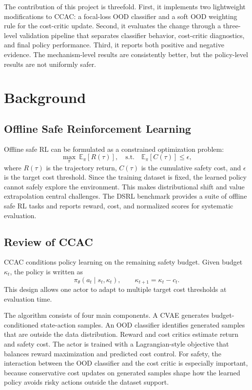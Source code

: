 \documentclass[11pt,a4paper]{article}
\newcommand{\ccac}{\textsc{CCAC}}
\begin{document}
The contribution of this project is threefold. First, it implements two
lightweight modifications to \ccac{}: a focal-loss OOD classifier and a soft
OOD weighting rule for the cost-critic update. Second, it evaluates the change
through a three-level validation pipeline that separates classifier behavior,
cost-critic diagnostics, and final policy performance. Third, it reports both
positive and negative evidence. The mechanism-level results are consistently
better, but the policy-level results are not uniformly safer.

\section{Background}

\subsection{Offline Safe Reinforcement Learning}

Offline safe RL can be formulated as a constrained optimization problem:
\begin{equation}
  \max_{\pi} \ \mathbb{E}_{\pi}\left[R(\tau)\right],
  \quad
  \mathrm{s.t.}\quad
  \mathbb{E}_{\pi}\left[C(\tau)\right] \le \epsilon,
  \label{eq:offline-safe-rl}
\end{equation}
where \(R(\tau)\) is the trajectory return, \(C(\tau)\) is the cumulative
safety cost, and \(\epsilon\) is the target cost threshold. Since the training
dataset is fixed, the learned policy cannot safely explore the environment.
This makes distributional shift and value extrapolation central challenges.
The DSRL benchmark \cite{liu2024dsrl} provides a suite of offline safe RL tasks
and reports reward, cost, and normalized scores for systematic evaluation.

\subsection{Review of CCAC}

\ccac{} conditions policy learning on the remaining safety budget. Given
budget \(\kappa_t\), the policy is written as
\begin{equation}
  \pi_\theta(a_t \mid s_t, \kappa_t),
  \qquad
  \kappa_{t+1} = \kappa_t - c_t.
  \label{eq:budget-update}
\end{equation}
This design allows one actor to adapt to multiple target cost thresholds at
evaluation time.

The algorithm consists of four main components. A CVAE generates
budget-conditioned state-action samples. An OOD classifier identifies generated
samples that are outside the data distribution. Reward and cost critics
estimate return and safety cost. The actor is trained with a Lagrangian-style
objective that balances reward maximization and predicted cost control. For
safety, the interaction between the OOD classifier and the cost critic is
especially important, because conservative cost updates on generated samples
shape how the learned policy avoids risky actions outside the dataset support.
\end{document}
